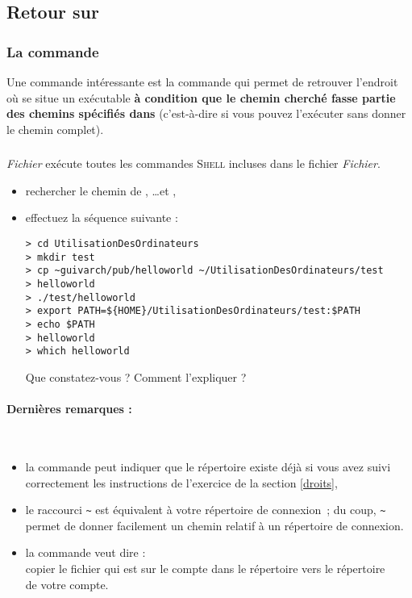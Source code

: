 \documentclass[11pt,a4paper]{article}
\newcommand{\shell}{\textsc{Shell}}
\begin{document}

\subsection{Retour sur }

\subsubsection{La commande }
Une commande intéressante est la commande  qui permet
de retrouver l'endroit où se situe un exécutable {\bf à
condition que le chemin cherché fasse partie des chemins
spécifiés dans } (c'est-à-dire si vous pouvez
l'exécuter sans donner le chemin complet).

\subsubsection{}

 {\em Fichier} exécute toutes les commandes
\shell{} incluses dans le fichier {\em Fichier}.

\begin{maw}

\begin{itemize}
 \item rechercher le chemin de , \ldots et
       ,
 \item effectuez la séquence suivante :
\begin{verbatim}
> cd UtilisationDesOrdinateurs
> mkdir test
> cp ~guivarch/pub/helloworld ~/UtilisationDesOrdinateurs/test
> helloworld
> ./test/helloworld
> export PATH=${HOME}/UtilisationDesOrdinateurs/test:$PATH
> echo $PATH
> helloworld
> which helloworld
\end{verbatim}
Que constatez-vous ? Comment l'expliquer ?
\end{itemize}
\end{maw}

\paragraph{Dernières remarques :}
\
\begin{itemize}
 \item la commande  peut indiquer que le répertoire 
       existe déjà si vous avez suivi correctement les instructions de
       l'exercice de la section \ref{droits},
 \item le raccourci \verb+~+ est équivalent à votre répertoire de connexion~;
       du coup, \verb+~+ permet de donner facilement un chemin relatif à
       un répertoire de connexion.
 \item la commande  veut dire :\\
       copier le fichier  qui est sur le compte 
       dans le répertoire \cmd{pub} vers le répertoire\\
        de votre compte.
\end{itemize}
\end{document}
